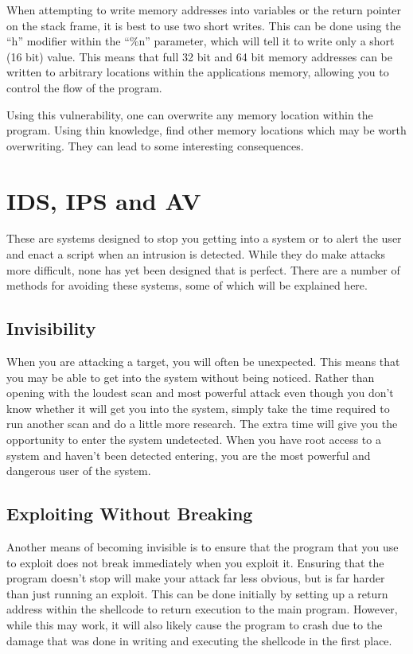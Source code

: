 \documentclass[a4paper,11pt]{report}
\begin{document}
			When attempting to write memory addresses into variables or the return pointer on the stack frame, it is best to use two short writes. 
			This can be done using the ``h'' modifier within the ``\%n'' parameter, which will tell it to write only a short (16 bit) value. 
			This means that full 32 bit and 64 bit memory addresses can be written to arbitrary locations within the applications memory, allowing you to control the flow of the program. 

			Using this vulnerability, one can overwrite any memory location within the program. 
			Using thin knowledge, find other memory locations which may be worth overwriting. 
			They can lead to some interesting consequences. 
	\section{IDS, IPS and AV}
		These are systems designed to stop you getting into a system or to alert the user and enact a script when an intrusion is detected. 
		While they do make attacks more difficult, none has yet been designed that is perfect. 
		There are a number of methods for avoiding these systems, some of which will be explained here. 

		\subsection{Invisibility}
			When you are attacking a target, you will often be unexpected. 
			This means that you may be able to get into the system without being noticed. 
			Rather than opening with the loudest scan and most powerful attack even though you don't know whether it will get you into the system,
			simply take the time required to run another scan and do a little more research. 
			The extra time will give you the opportunity to enter the system undetected. 
			When you have root access to a system and haven't been detected entering, you are the most powerful and dangerous user of the system. 

		\subsection{Exploiting Without Breaking}
			Another means of becoming invisible is to ensure that the program that you use to exploit does not break immediately when you exploit it. 
			Ensuring that the program doesn't stop will make your attack far less obvious, but is far harder than just running an exploit. 
			This can be done initially by setting up a return address within the shellcode to return execution to the main program. 
			However, while this may work, it will also likely cause the program to crash due to the damage that was done in writing and executing the shellcode in the first place. 
			
\end{document}

